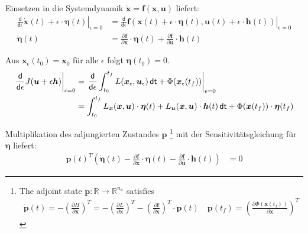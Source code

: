 \documentclass[a4paper, 12pt]{scrartcl}
\newcommand{\dt}{\thinspace \mathsf{dt}}
\begin{document}
Einsetzen in die Systemdynamik $\bm{\dot{x}}=\bm{f}(\bm{x},\bm{u})$ liefert:
%
\begin{align*}
    \left. \frac{\mathsf{d}}{\mathsf{d}\epsilon}
    \bm{\dot{x}}(t) + \epsilon \cdot \bm{\dot{\eta}}(t) \right|_{\epsilon=0}
    &=
    \left.
    \frac{\mathsf{d}}{\mathsf{d}\epsilon}
    \bm{f}
    \left(
        \bm{x}(t) + \epsilon \cdot \bm{\eta}(t),\bm{u}(t) + \epsilon \cdot \bm{h}(t)
    \right)
    \right|_{\epsilon=0}
    \\
    \bm{\dot{\eta}}(t) 
    &=
    \frac{\partial \bm{f}}{\partial \bm{x}} \cdot \bm{\eta}(t) 
    +
    \frac{\partial \bm{f}}{\partial \bm{u}} \cdot \bm{h}(t) 
\end{align*}

Aus $\bm{x}_\epsilon(t_0) = \bm{x}_0$ für alle $\epsilon$ folgt $\bm{\eta}(t_0) = 0$. 
%
\begin{align*}
    \left. 
        \frac{\mathsf{d}}{\mathsf{d}\epsilon} 
        J(\bm{u} + \epsilon \bm{h}) 
    \right|_{\epsilon=0} 
    &= 
    \left.
        \frac{\mathsf{d}}{\mathsf{d}\epsilon} 
        \int_{t_0}^{t_f} L(\bm{x}_\epsilon, \bm{u}_\epsilon) \dt + \Phi(\bm{x}_\epsilon(t_f))
    \right|_{\epsilon=0}
    \\
    &=
    \int_{t_0}^{t_f} L_{\bm{x}}(\bm{x}, \bm{u}) \cdot \bm{\eta}(t)   
    + L_{\bm{u}}(\bm{x}, \bm{u}) \cdot \bm{h}(t) \dt 
    + \Phi(\bm{x}(t_f)) \cdot \bm{\eta}(t_f)
\end{align*}

Multiplikation des adjungierten Zustandes $\bm{p}$
\footnote{
    The adjoint state $\bm{p}:\mathbb{R} \to \mathbb{R}^{n_x}$ satisfies 
    \begin{align*}
        \bm{\dot{p}}(t) 
        = 
        - \left(\frac{\partial H}{\partial \bm{x}}\right)^T 
        = 
        - \left(\frac{\partial L}{\partial \bm{x}}\right)^T 
        - \left(\frac{\partial \bm{f}}{\partial \bm{x}}\right)^T \cdot \bm{p}(t)
        \quad
        \bm{p}(t_f) = \left(\frac{\partial \Phi(\bm{x}(t_f))}{\partial \bm{x}}\right)^T
    \end{align*}
} 
mit der Sensitivitätsgleichung für $\bm{\eta}$ liefert:
%
\begin{align*}
    \bm{p}(t)^T
    \left(
        \bm{\dot{\eta}}(t) 
        -
        \frac{\partial \bm{f}}{\partial \bm{x}} \cdot \bm{\eta}(t) 
        -
        \frac{\partial \bm{f}}{\partial \bm{u}} \cdot \bm{h}(t)
    \right)
    &=
    0
\end{align*}
\end{document}

